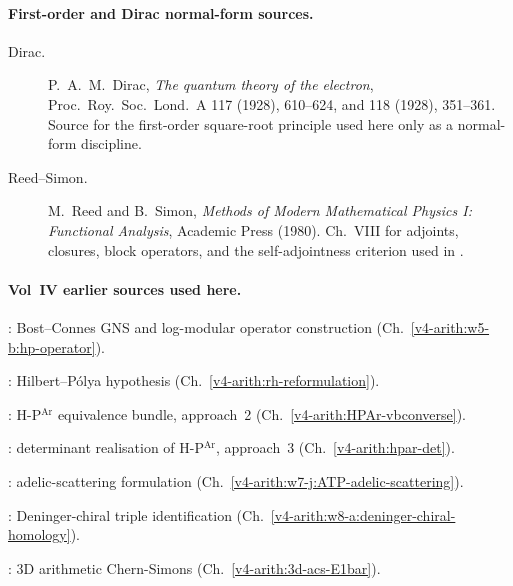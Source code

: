 \paragraph{First-order and Dirac normal-form sources.}
\begin{description}
\item[Dirac.] P.~A.~M.~Dirac, \emph{The quantum theory of the
electron}, Proc.~Roy.~Soc.~Lond.~A 117 (1928), 610--624, and
118 (1928), 351--361. Source for the first-order square-root
principle used here only as a normal-form discipline.
\item[Reed--Simon.] M.~Reed and B.~Simon, \emph{Methods of Modern
Mathematical Physics I: Functional Analysis}, Academic Press (1980).
Ch.~VIII for adjoints, closures, block operators, and the
self-adjointness criterion used in
.
\end{description}

\paragraph{Vol~IV earlier sources used here.}
\begin{description}
\item {}: Bost--Connes GNS and
log-modular operator construction (Ch.~\ref{v4-arith:w5-b:hp-operator}).
\item {}: Hilbert--P\'olya hypothesis
(Ch.~\ref{v4-arith:rh-reformulation}).
\item {}: H-P\(^{\mathrm{Ar}}\) equivalence bundle, approach~2
(Ch.~\ref{v4-arith:HPAr-vbconverse}).
\item {}: determinant realisation of H-P\(^{\mathrm{Ar}}\), approach~3
(Ch.~\ref{v4-arith:hpar-det}).
\item {}: adelic-scattering
formulation (Ch.~\ref{v4-arith:w7-j:ATP-adelic-scattering}).
\item {}: Deninger-chiral
triple identification (Ch.~\ref{v4-arith:w8-a:deninger-chiral-homology}).
\item {}: 3D arithmetic Chern-Simons
(Ch.~\ref{v4-arith:3d-acs-E1bar}).
\end{description}
